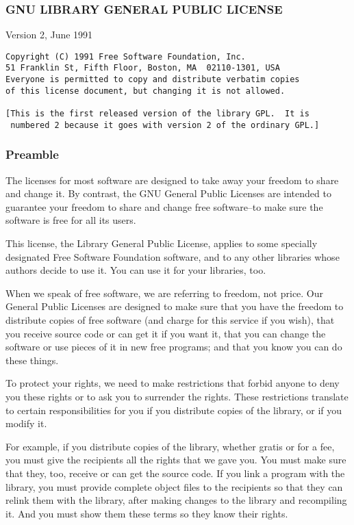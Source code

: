 \documentclass[]{article}
\date{}
\begin{document}
\subsubsection{GNU LIBRARY GENERAL PUBLIC LICENSE}

Version 2, June 1991

\begin{verbatim}
Copyright (C) 1991 Free Software Foundation, Inc.
51 Franklin St, Fifth Floor, Boston, MA  02110-1301, USA
Everyone is permitted to copy and distribute verbatim copies
of this license document, but changing it is not allowed.

[This is the first released version of the library GPL.  It is
 numbered 2 because it goes with version 2 of the ordinary GPL.]
\end{verbatim}

\subsubsection{Preamble}

The licenses for most software are designed to take away your freedom to
share and change it. By contrast, the GNU General Public Licenses are
intended to guarantee your freedom to share and change free software--to
make sure the software is free for all its users.

This license, the Library General Public License, applies to some
specially designated Free Software Foundation software, and to any other
libraries whose authors decide to use it. You can use it for your
libraries, too.

When we speak of free software, we are referring to freedom, not price.
Our General Public Licenses are designed to make sure that you have the
freedom to distribute copies of free software (and charge for this
service if you wish), that you receive source code or can get it if you
want it, that you can change the software or use pieces of it in new
free programs; and that you know you can do these things.

To protect your rights, we need to make restrictions that forbid anyone
to deny you these rights or to ask you to surrender the rights. These
restrictions translate to certain responsibilities for you if you
distribute copies of the library, or if you modify it.

For example, if you distribute copies of the library, whether gratis or
for a fee, you must give the recipients all the rights that we gave you.
You must make sure that they, too, receive or can get the source code.
If you link a program with the library, you must provide complete object
files to the recipients so that they can relink them with the library,
after making changes to the library and recompiling it. And you must
show them these terms so they know their rights.
\end{document}
